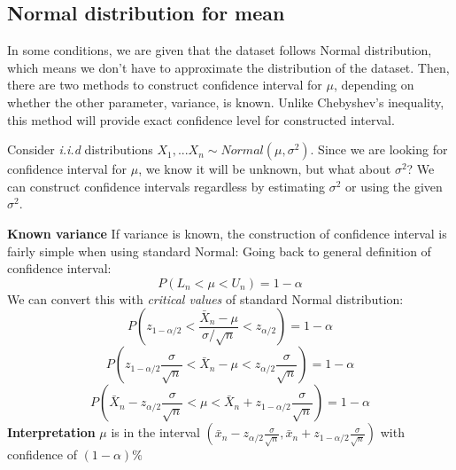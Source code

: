 \documentclass[a4paper]{article}
\begin{document}
\subsection{Normal distribution for mean}
In some conditions, we are given that the dataset follows Normal distribution, which means we don't have to approximate the distribution of the dataset. 
Then, there are two methods to construct confidence interval for $\mu$, depending on whether the other parameter, variance, is known.
Unlike Chebyshev's inequality, this method will provide exact confidence level for constructed interval.

Consider \textit{i.i.d} distributions $X_1,...X_n \sim Normal(\mu,\sigma^2)$. 
Since we are looking for confidence interval for $\mu$, we know it will be unknown, but what about $\sigma^2$? 
We can construct confidence intervals regardless by estimating $\sigma^2$ or using the given $\sigma^2$.
\begin{mdframed}
    \textbf{Known variance}
    \newline
    If variance is known, the construction of confidence interval is fairly simple when using standard Normal:
    \newline
    Going back to general definition of confidence interval:
    $$P(L_n<\mu<U_n) = 1- \alpha$$
    We can convert this with \textit{critical values} of standard Normal distribution:
    $$P(z_{1-\alpha/2}<\frac{\bar{X}_n - {\mu}}{\sigma/\sqrt{n}}<z_{\alpha/2}) = 1-\alpha$$
    $$P(z_{1-\alpha/2}\frac{\sigma}{\sqrt{n}}<\bar{X}_n - {\mu}< z_{\alpha/2}\frac{\sigma}{\sqrt{n}}) = 1-\alpha$$
    $$P(\bar{X}_n-z_{\alpha/2}\frac{\sigma}{\sqrt{n}}<\mu< \bar{X}_n+z_{1-\alpha/2}\frac{\sigma}{\sqrt{n}}) = 1-\alpha$$
    \textbf{Interpretation}
    \newline
    $\mu$ is in the interval $(\bar{x}_n-z_{\alpha/2}\frac{\sigma}{\sqrt{n}}, \bar{x}_n+z_{1-\alpha/2}\frac{\sigma}{\sqrt{n}})$ with confidence of $(1-\alpha)\%$
\end{mdframed}
\end{document}
